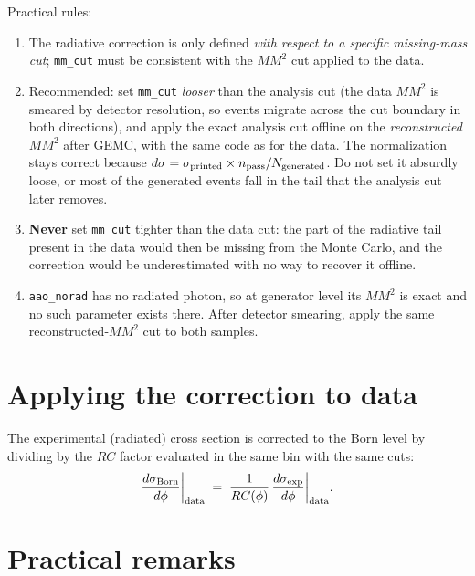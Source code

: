 \documentclass[11pt]{article}
\begin{document}
Practical rules:
\begin{enumerate}
  \item The radiative correction is only defined \emph{with respect to a
        specific missing-mass cut}; \texttt{mm\_cut} must be consistent with
        the $MM^2$ cut applied to the data.
  \item Recommended: set \texttt{mm\_cut} \emph{looser} than the analysis
        cut (the data $MM^2$ is smeared by detector resolution, so events
        migrate across the cut boundary in both directions), and apply the
        exact analysis cut offline on the \emph{reconstructed} $MM^2$ after
        GEMC, with the same code as for the data. The normalization stays
        correct because
        $d\sigma = \sigma_{\rm printed}\times n_{\rm pass}/N_{\rm generated}$.
        Do not set it absurdly loose, or most of the generated events fall
        in the tail that the analysis cut later removes.
  \item \textbf{Never} set \texttt{mm\_cut} tighter than the data cut: the
        part of the radiative tail present in the data would then be missing
        from the Monte Carlo, and the correction would be underestimated
        with no way to recover it offline.
  \item \texttt{aao\_norad} has no radiated photon, so at generator level
        its $MM^2$ is exact and no such parameter exists there. After
        detector smearing, apply the same reconstructed-$MM^2$ cut to both
        samples.
\end{enumerate}

\section{Applying the correction to data}

The experimental (radiated) cross section is corrected to the Born level by
dividing by the $RC$ factor evaluated in the same bin with the same cuts:
\begin{equation}
  \frac{d\sigma_{\rm Born}}{d\phi}\bigg|_{\rm data}
  \;=\;
  \frac{1}{RC(\phi)}\,
  \frac{d\sigma_{\rm exp}}{d\phi}\bigg|_{\rm data}.
\end{equation}

\section{Practical remarks}
\end{document}
